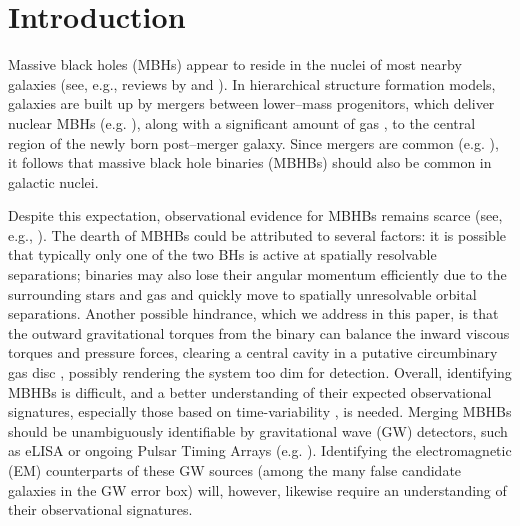 
\section{Introduction}

Massive black holes (MBHs) appear to reside in the nuclei of most
nearby galaxies (see, e.g., reviews by \citealt{kr95} and
\citealt{ff05}).  In hierarchical structure formation models, galaxies
are built up by mergers between lower--mass progenitors, which deliver
nuclear MBHs (e.g. \citealt{Springel+2005,Robertson+2006}), along with
a significant amount of gas \citep{BH1992}, to the central region of
the newly born post--merger galaxy.  Since mergers are common
(e.g. \citealt{HK2002}), it follows that massive black hole binaries
(MBHBs) should also be common in galactic nuclei.

Despite this expectation, observational evidence for MBHBs remains
scarce (see, e.g., \citealt{Komossa:Rev06,Tsalmantza:2011, Eracleous:2011}).
The dearth
of MBHBs could be attributed to several factors: it is possible that
typically only one of the two BHs is active at spatially resolvable
separations; binaries may also lose their angular momentum efficiently
due to the surrounding stars and gas and quickly move to spatially
unresolvable orbital separations.  Another possible hindrance, which
we address in this paper, is that the outward gravitational torques
from the binary can balance the inward viscous torques and pressure forces, 
clearing a central cavity in a putative circumbinary gas disc 
\citep{AL94}, possibly rendering the system too dim for
detection.  Overall, identifying MBHBs is difficult, and a better
understanding of their expected observational signatures, especially
those based on time-variability \citep{Haiman+2009}, is
needed. Merging MBHBs should be unambiguously identifiable by
gravitational wave (GW) detectors, such as eLISA \citep{eLISA:AmaroSeoane:2013} or
ongoing Pulsar Timing Arrays (e.g. \citealt{PTAs}).  Identifying the
electromagnetic (EM) counterparts of these GW sources (among the many
false candidate galaxies in the GW error box) will, however, likewise
require an understanding of their observational signatures.

